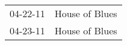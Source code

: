 \begin{supertabular}{p{0.25\columnwidth}p{0.75\columnwidth}}
 04-22-11 &  House of Blues \\
 04-23-11 &  House of Blues \\
\end{supertabular}
